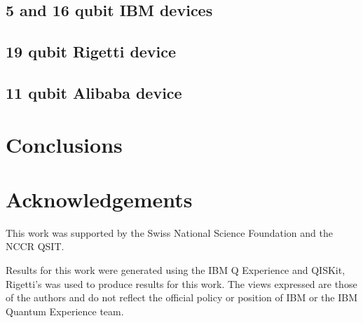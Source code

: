 \documentclass[aps,prl,twocolumn,showpacs,preprintnumbers]{revtex4-1}
\begin{document}
\subsection{5 and 16 qubit IBM devices}


\subsection{19 qubit Rigetti device}


\subsection{11 qubit Alibaba device}



\section{Conclusions}






\section{Acknowledgements}

This work was supported by the Swiss National Science Foundation and the NCCR QSIT.

Results for this work were generated using the IBM Q Experience and QISKit, Rigetti’s was used to produce results for this work. The views expressed are those of the authors and do not reflect the official policy or position of IBM or the IBM Quantum Experience team.



\end{document}

